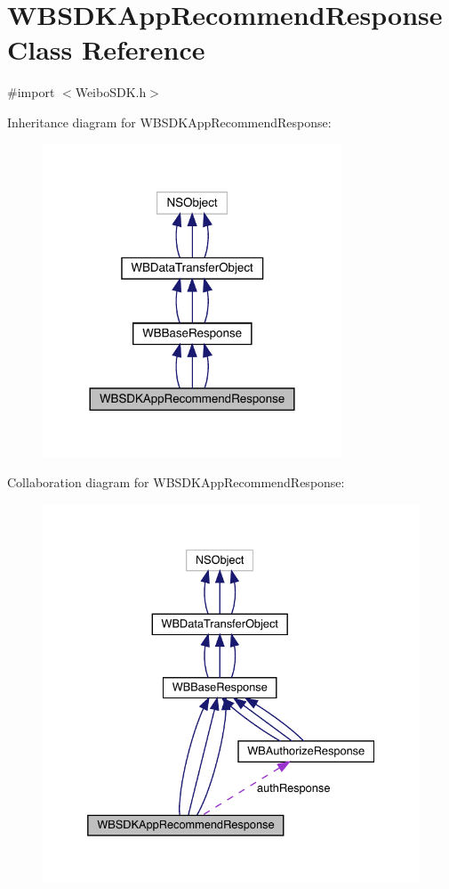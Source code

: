\hypertarget{interface_w_b_s_d_k_app_recommend_response}{}\section{W\+B\+S\+D\+K\+App\+Recommend\+Response Class Reference}
\label{interface_w_b_s_d_k_app_recommend_response}


{\ttfamily \#import $<$Weibo\+S\+D\+K.\+h$>$}



Inheritance diagram for W\+B\+S\+D\+K\+App\+Recommend\+Response\+:\nopagebreak
\begin{figure}[H]
\begin{center}
\leavevmode
\includegraphics[width=252pt]{interface_w_b_s_d_k_app_recommend_response__inherit__graph}
\end{center}
\end{figure}


Collaboration diagram for W\+B\+S\+D\+K\+App\+Recommend\+Response\+:\nopagebreak
\begin{figure}[H]
\begin{center}
\leavevmode
\includegraphics[width=332pt]{interface_w_b_s_d_k_app_recommend_response__coll__graph}
\end{center}
\end{figure}
